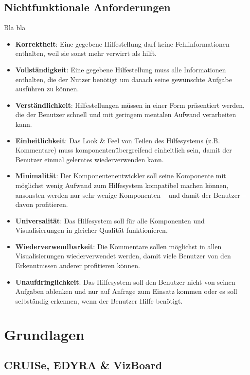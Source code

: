 \documentclass[
	headsepline,
	footsepline,
	fontsize=12pt,
	bibliography=totoc
]{scrbook}
\begin{document}
\subsection{Nichtfunktionale Anforderungen}
\label{section:nichtfunktionale_anforderungen}

Bla bla

\begin{itemize}
	\item\textbf{Korrektheit}: Eine gegebene Hilfestellung darf keine Fehlinformationen enthalten, weil sie sonst mehr verwirrt als hilft.
	\item\textbf{Vollständigkeit}: Eine gegebene Hilfestellung muss alle Informationen enthalten, die der Nutzer benötigt um danach seine gewünschte Aufgabe ausführen zu können.
	\item\textbf{Verständlichkeit}: Hilfestellungen müssen in einer Form präsentiert werden, die der Benutzer schnell und mit geringem mentalen Aufwand verarbeiten kann.
	\item\textbf{Einheitlichkeit}: Das Look \& Feel von Teilen des Hilfesystems (z.B. Kommentare) muss komponentenübergreifend einheitlich sein, damit der Benutzer einmal gelerntes wiederverwenden kann.
	\item\textbf{Minimalität}: Der Komponentenentwickler soll seine Komponente mit möglichst wenig Aufwand zum Hilfesystem kompatibel machen können, ansonsten werden nur sehr wenige Komponenten -- und damit der Benutzer -- davon profitieren.
	\item\textbf{Universalität}: Das Hilfesystem soll für alle Komponenten und Visualisierungen in gleicher Qualität funktionieren.
	\item\textbf{Wiederverwendbarkeit}: Die Kommentare sollen möglichst in allen Visualisierungen wiederverwendet werden, damit viele Benutzer von den Erkenntnissen anderer profitieren können.
	\item\textbf{Unaufdringlichkeit}: Das Hilfesystem soll den Benutzer nicht von seinen Aufgaben ablenken und nur auf Anfrage zum Einsatz kommen oder es soll selbständig erkennen, wenn der Benutzer Hilfe benötigt.
\end{itemize}

\section{Grundlagen}
\label{section:grundlagen}

\subsection{CRUISe, EDYRA \& VizBoard}
\label{section:vizboard}
\end{document}
